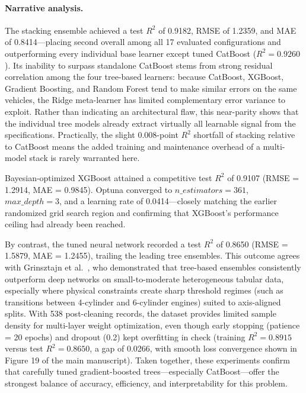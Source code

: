 \paragraph{Narrative analysis.}
The stacking ensemble achieved a test \(R^2\) of 0.9182, RMSE of 1.2359, and MAE of 0.8414---placing second overall among all 17 evaluated configurations and outperforming every individual base learner except tuned CatBoost (\(R^2 = 0.9260\)). Its inability to surpass standalone CatBoost stems from strong residual correlation among the four tree-based learners: because CatBoost, XGBoost, Gradient Boosting, and Random Forest tend to make similar errors on the same vehicles, the Ridge meta-learner has limited complementary error variance to exploit. Rather than indicating an architectural flaw, this near-parity shows that the individual tree models already extract virtually all learnable signal from the specifications. Practically, the slight 0.008-point \(R^2\) shortfall of stacking relative to CatBoost means the added training and maintenance overhead of a multi-model stack is rarely warranted here.

Bayesian-optimized XGBoost attained a competitive test \(R^2\) of 0.9107 (RMSE = 1.2914, MAE = 0.9845). Optuna converged to \(n\_estimators = 361\), \(max\_depth = 3\), and a learning rate of 0.0414---closely matching the earlier randomized grid search region and confirming that XGBoost's performance ceiling had already been reached.

By contrast, the tuned neural network recorded a test \(R^2\) of 0.8650 (RMSE = 1.5879, MAE = 1.2455), trailing the leading tree ensembles. This outcome agrees with Grinsztajn et al.~\cite{grinsztajn2022tree}, who demonstrated that tree-based ensembles consistently outperform deep networks on small-to-moderate heterogeneous tabular data, especially where physical constraints create sharp threshold regimes (such as transitions between 4-cylinder and 6-cylinder engines) suited to axis-aligned splits. With 538 post-cleaning records, the dataset provides limited sample density for multi-layer weight optimization, even though early stopping (patience = 20 epochs) and dropout (0.2) kept overfitting in check (training \(R^2 = 0.8915\) versus test \(R^2 = 0.8650\), a gap of 0.0266, with smooth loss convergence shown in Figure 19 of the main manuscript). Taken together, these experiments confirm that carefully tuned gradient-boosted trees---especially CatBoost---offer the strongest balance of accuracy, efficiency, and interpretability for this problem.


